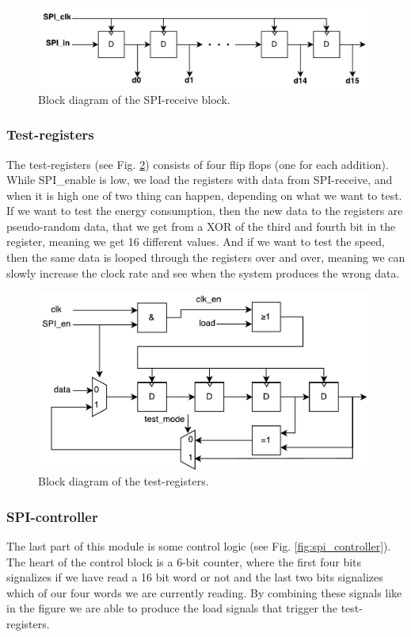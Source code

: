 \begin{figure}[H]
	\centering
	\captionsetup{justification=centering}
	\includegraphics[scale=0.5]{../figures/SPI_receive.pdf}
	\caption{Block diagram of the SPI-receive block.} \label{fig:spi_receive}
\end{figure}

\subsubsection{Test-registers}
The test-registers (see Fig. \ref{fig:spi_prbs}) consists of four flip flops (one for each addition). While SPI\_enable is low, we load the registers with data from SPI-receive, and when it is high one of two thing can happen, depending on what we want to test. If we want to test the energy consumption, then the new data to the registers are pseudo-random data, that we get from a XOR of the third and fourth bit in the register, meaning we get 16 different values. And if we want to test the speed, then the same data is looped through the registers over and over, meaning we can slowly increase the clock rate and see when the system produces the wrong data.

\begin{figure}[H]
	\centering
	\captionsetup{justification=centering}
	\includegraphics[scale=0.5]{../figures/SPI_PRBS_2.pdf}
	\caption{Block diagram of the test-registers.} \label{fig:spi_prbs}
\end{figure}

\subsubsection{SPI-controller}
The last part of this module is some control logic (see Fig. \ref{fig:spi_controller}). The heart of the control block is a 6-bit counter, where the first four bits signalizes if we have read a 16 bit word or not and the last two bits signalizes which of our four words we are currently reading. By combining these signals like in the figure we are able to produce the load signals that trigger the test-registers.

